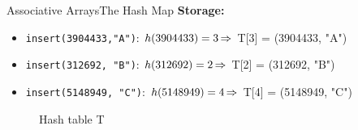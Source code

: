 \begin{frame}{Associative Arrays}{The Hash Map}
  \textbf{Storage:}
  \vspace{0.1em}
  \begin{itemize}
    \setlength\itemsep{0.75em}
    \item<2->
    \small \texttt{insert(3904433,"A")}:
    $h(3904433) = 3 \hspace*{-0.1em} \Rightarrow$
    T[3] = {\color{inkscapeGreen}(3904433, "A")}
    \item<3->
    \small \texttt{insert(312692, "B")}:
    $h(312692) = 2 \hspace*{-0.1em} \Rightarrow$
    T[2] = {\color{inkscapeMaroon}(312692, "B")}
    \item<4->
    \small \texttt{insert(5148949, "C")}:
    $h(5148949) = 4 \hspace*{-0.1em} \Rightarrow$
    T[4] = {\color{inkscapeNavy}(5148949, "C")}
  \end{itemize}
  \vspace{0.1em}
  \begin{figure}
  \caption{Hash table T}
  \centering
{}%
%
%
  \end{figure}
\end{frame}


